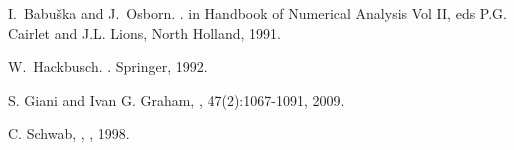 \documentclass[preprint,12pt]{elsarticle}
\begin{document}
\begin{thebibliography}{[KLR73]}
I.~Babu\v{s}ka and J.~Osborn.
.
\newblock in Handbook of Numerical Analysis Vol II, eds P.G. Cairlet and J.L. Lions, North Holland, 1991.

W.~Hackbusch.
.
\newblock Springer, 1992.

S. Giani and Ivan G. Graham,
,
 47(2):1067-1091, 2009.

C. Schwab,
,
, 1998.


\end{thebibliography}
\end{document}
